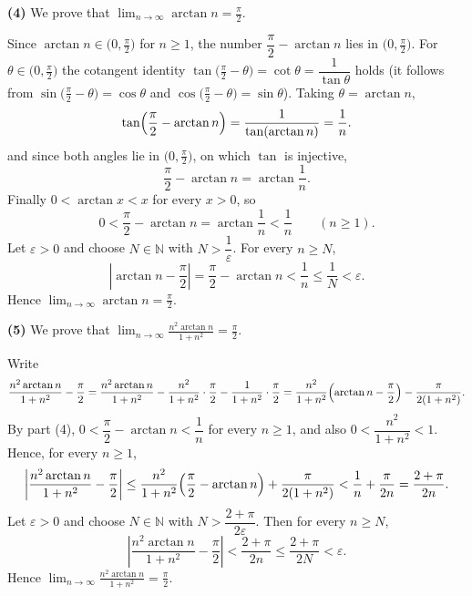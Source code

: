 \documentclass[11pt,a4paper]{article}
\newenvironment{solution}[1]{%
  \par\addvspace{1.7ex}%
  \noindent{\color{solutioncolor}\textbf{#1}}\hspace{0.55em}\ignorespaces}%
  {\par\addvspace{0.9ex}}
\begin{document}
\begin{solution}{Solution 2.1.3}
\medskip
\noindent\textbf{(4)} We prove that $\displaystyle\lim_{n\to\infty}\arctan n=\frac\pi2$.

Since $\arctan n\in\bigl(0,\tfrac\pi2\bigr)$ for $n\ge1$, the number
$\dfrac\pi2-\arctan n$ lies in $\bigl(0,\tfrac\pi2\bigr)$. For
$\theta\in\bigl(0,\tfrac\pi2\bigr)$ the cotangent identity
$\tan\bigl(\tfrac\pi2-\theta\bigr)=\cot\theta=\dfrac{1}{\tan\theta}$ holds
(it follows from $\sin\bigl(\tfrac\pi2-\theta\bigr)=\cos\theta$ and
$\cos\bigl(\tfrac\pi2-\theta\bigr)=\sin\theta$). Taking $\theta=\arctan n$,
\[
  \tan\Bigl(\frac\pi2-\arctan n\Bigr)=\frac{1}{\tan(\arctan n)}=\frac1n .
\]
and since both angles lie in $\bigl(0,\tfrac\pi2\bigr)$, on which $\tan$ is
injective,
\[
  \frac\pi2-\arctan n=\arctan\frac1n .
\]
Finally $0<\arctan x<x$ for every $x>0$, so
\[
  0<\frac\pi2-\arctan n=\arctan\frac1n<\frac1n\qquad(n\ge1).
\]
Let $\varepsilon>0$ and choose $N\in\mathbb{N}$ with $N>\dfrac1\varepsilon$. For
every $n\ge N$,
\[
  \left|\arctan n-\frac\pi2\right|=\frac\pi2-\arctan n<\frac1n\le\frac1N<\varepsilon .
\]
Hence $\displaystyle\lim_{n\to\infty}\arctan n=\frac\pi2$.

\medskip
\noindent\textbf{(5)} We prove that
$\displaystyle\lim_{n\to\infty}\frac{n^{2}\arctan n}{1+n^{2}}=\frac\pi2$.

Write
\[
  \frac{n^{2}\arctan n}{1+n^{2}}-\frac\pi2
  =\frac{n^{2}\arctan n}{1+n^{2}}-\frac{n^{2}}{1+n^{2}}\cdot\frac\pi2
   -\frac{1}{1+n^{2}}\cdot\frac\pi2
  =\frac{n^{2}}{1+n^{2}}\Bigl(\arctan n-\frac\pi2\Bigr)-\frac{\pi}{2(1+n^{2})} .
\]
By part (4), $0<\dfrac\pi2-\arctan n<\dfrac1n$ for every $n\ge1$, and also
$0<\dfrac{n^{2}}{1+n^{2}}<1$. Hence, for every $n\ge1$,
\[
  \left|\frac{n^{2}\arctan n}{1+n^{2}}-\frac\pi2\right|
  \le\frac{n^{2}}{1+n^{2}}\Bigl(\frac\pi2-\arctan n\Bigr)
   +\frac{\pi}{2(1+n^{2})}
  <\frac1n+\frac{\pi}{2n}=\frac{2+\pi}{2n} .
\]
Let $\varepsilon>0$ and choose $N\in\mathbb{N}$ with
$N>\dfrac{2+\pi}{2\varepsilon}$. Then for every $n\ge N$,
\[
  \left|\frac{n^{2}\arctan n}{1+n^{2}}-\frac\pi2\right|
  <\frac{2+\pi}{2n}\le\frac{2+\pi}{2N}<\varepsilon .
\]
Hence $\displaystyle\lim_{n\to\infty}\frac{n^{2}\arctan n}{1+n^{2}}=\frac\pi2$.
\end{solution}
\end{document}
